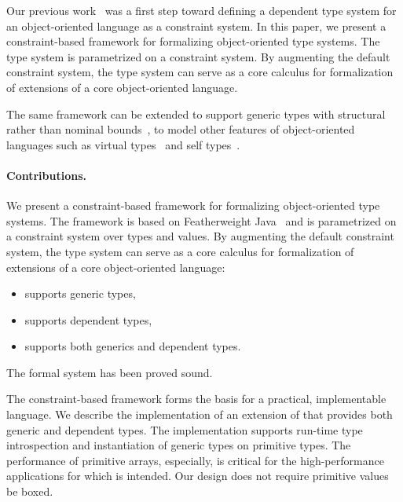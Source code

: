 Our previous work~\cite{constrained-types}
was a first step toward defining a dependent type system 
for an object-oriented language as a constraint system.
%
In this paper,
we present a constraint-based framework for formalizing
object-oriented type systems.
The type system is parametrized on a constraint system.
By augmenting the default constraint system,
the type system can serve as a core calculus 
for formalization of extensions of a core object-oriented language. 

The same framework can be extended to support generic types with
structural rather than nominal 
bounds~\cite{java-popl97,haskell-type-classes},
to model other features of object-oriented languages
such as virtual types~\cite{mp89-virtual-classes,beta,ernst06-virtual}
and self types~\cite{bruce-binary,bsg95}.


\paragraph{Contributions.}

We present a constraint-based framework \FX{}
for formalizing
object-oriented type systems.
The framework is based on
Featherweight Java~\cite{FJ} and
is parametrized on a constraint system over types and values.
By augmenting the default constraint system,
the type system can serve as a core calculus 
for formalization of extensions of a core object-oriented
language:
\begin{itemize}
\item \FXG{}
supports generic types,
\item \FXD{}
supports dependent types,
\item \FXGD{}
supports both generics and dependent types.
\end{itemize}
The formal system has been proved sound.

The constraint-based framework forms the basis for a practical,
implementable language.
We describe the implementation of an extension of \Xten{} that
provides both generic and dependent types.  The implementation
supports run-time type introspection and instantiation of
generic types on primitive types.
The performance of primitive arrays, especially, is
critical for the high-performance applications for which
\Xten{} is intended.
Our design does not require primitive values be boxed.

